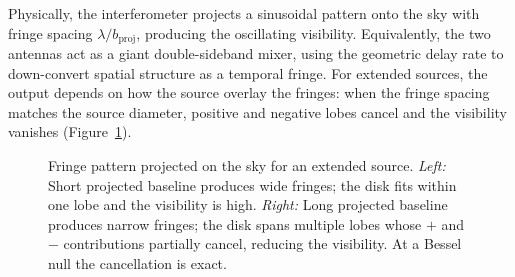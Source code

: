 \documentclass[10pt,preprint2]{aastex}
\begin{document}
Physically, the interferometer projects a sinusoidal pattern onto the sky with fringe spacing $\lambda/b_{\mathrm{proj}}$, producing the oscillating visibility. Equivalently, the two antennas act as a giant double-sideband mixer, using the geometric delay rate to down-convert spatial structure as a temporal fringe. For extended sources, the output depends on how the source overlay the fringes: when the fringe spacing matches the source diameter, positive and negative lobes cancel and the visibility vanishes (Figure~\ref{fig:fringe_on_sky}).

\begin{figure}[H]
\centering
{}
\caption{Fringe pattern projected on the sky for an extended source. \textit{Left:} Short projected baseline produces wide fringes; the disk fits within one lobe and the visibility is high. \textit{Right:} Long projected baseline produces narrow fringes; the disk spans multiple lobes whose $+$ and $-$ contributions partially cancel, reducing the visibility. At a Bessel null the cancellation is exact.}
\label{fig:fringe_on_sky}
\end{figure}
\end{document}
